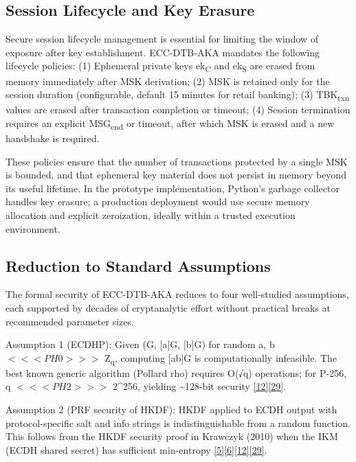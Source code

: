 \subsection{Session Lifecycle and Key Erasure}

\indent Secure session lifecycle management is essential for limiting the window of exposure after key establishment. ECC-DTB-AKA mandates the following lifecycle policies: (1) Ephemeral private keys ek\textsubscript{C} and ek\textsubscript{S} are erased from memory immediately after MSK derivation; (2) MSK is retained only for the session duration (configurable, default 15 minutes for retail banking); (3) TBK\textsubscript{txn} values are erased after transaction completion or timeout; (4) Session termination requires an explicit MSG\textsubscript{end} or timeout, after which MSK is erased and a new handshake is required.

\indent These policies ensure that the number of transactions protected by a single MSK is bounded, and that ephemeral key material does not persist in memory beyond its useful lifetime. In the prototype implementation, Python's garbage collector handles key erasure; a production deployment would use secure memory allocation and explicit zeroization, ideally within a trusted execution environment.

\subsection{Reduction to Standard Assumptions}

\indent The formal security of ECC-DTB-AKA reduces to four well-studied assumptions, each supported by decades of cryptanalytic effort without practical breaks at recommended parameter sizes.

\indent Assumption 1 (ECDHP): Given (G, [a]G, [b]G) for random a, b $<<<PH0>>>$ Z\textsubscript{q}, computing [ab]G is computationally infeasible. The best known generic algorithm (Pollard rho) requires O(√q) operations; for P-256, q $<<<PH2>>>$ 2\textasciicircum{}256, yielding \textasciitilde{}128-bit security \hyperref[ref:12]{[12]}\hyperref[ref:29]{[29]}.

\indent Assumption 2 (PRF security of HKDF): HKDF applied to ECDH output with protocol-specific salt and info strings is indistinguishable from a random function. This follows from the HKDF security proof in Krawczyk (2010) when the IKM (ECDH shared secret) has sufficient min-entropy \hyperref[ref:5]{[5]}\hyperref[ref:6]{[6]}\hyperref[ref:12]{[12]}\hyperref[ref:29]{[29]}.

